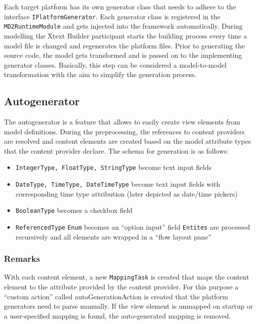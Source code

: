 
\label{sec:dev-preprocessor}

Each target platform has its own generator class that needs to adhere to the interface  \lstinline|IPlatformGenerator|. Each generator class is registered in the \lstinline|MD2RuntimeModule| and gets injected into the framework automatically. During modelling the Xtext Builder participant starts the building process every time a model file is changed and regenerates the platform files.
Prior to generating the source code, the model gets transformed and is passed on to the implementing generator classes. Basically, this step can be considered a model-to-model transformation with the aim to simplify the generation process.

\subsection{Autogenerator}
The autogenerator is a feature that allows to easily create view elements from model definitions. During the preprocessing, the references to content providers are resolved and content elements are created based on the model attribute types that the content provider declare. The schema for generation is as follows:

\begin{itemize}
	\item \lstinline!IntegerType, FloatType, StringType! become text input fields
	\item \lstinline!DateType, TimeType, DateTimeType! become text input fields with corresponding time type attribution (later depicted as date/time pickers)
	\item \lstinline!BooleanType! becomes a checkbox field
	\item \lstinline!ReferencedType!
		\subitem \lstinline!Enum! becomes an \enquote{option input} field
		\subitem \lstinline!Entites! are processed recursively and all elements are wrapped in a \enquote{flow layout pane}
\end{itemize}

\subsubsection{Remarks}
With each content element, a new \lstinline!MappingTask! is created that maps the content element to the attribute provided by the content provider. For this purpose a \enquote{custom action} called autoGenerationAction is created that the platform generators need to parse manually. If the view element is unmapped on startup or a user-specified mapping is found, the auto-generated mapping is removed.

